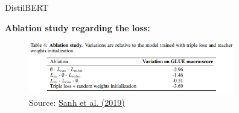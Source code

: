 
\begin{frame}{DistilBERT \href{https://arxiv.org/pdf/1910.01108.pdf}{}}

\vfill

	\textbf{Ablation study regarding the loss:}

	\begin{figure}
		\centering
		\includegraphics[width = 9cm]{figure/distilbert-ablation.png}\\ 
		\footnotesize{Source:} \href{https://arxiv.org/pdf/1910.01108.pdf}{\footnotesize Sanh et al. (2019)}
	\end{figure}

\vfill
	
\end{frame}


\endlecture

